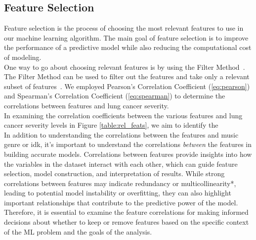 \documentclass[times, twocolumn]{article}
\begin{document}
\subsection{Feature Selection} Feature selection is the process of choosing the most relevant features to use in our machine learning algorithm. The main goal of feature selection is to improve the performance of a predictive model while also reducing the computational cost of modeling.\\

One way to go about choosing relevant features is by using the Filter Method~\cite{HeavyAI}. The Filter Method can be used to filter out the features and take only a relevant subset of features~\cite{HeavyAI}. We employed Pearson's Correlation Coefficient (\ref{eq:pearson}) and Spearman's Correlation Coefficient (\ref{eq:spearman}) to determine the correlations between features and lung cancer severity.\\


In examining the correlation coefficients between the various features and lung cancer severity levels in Figure \ref{table:rel_feats}, we aim to identify the \\

In addition to understanding the correlations between the features and music genre or idk, it's important to understand the correlations \textit{between} the features in building accurate models. Correlations between features provide insights into how the variables in the dataset interact with each other, which can guide feature selection, model construction, and interpretation of results. While strong correlations between features may indicate redundancy or multicollinearity*, leading to potential model instability or overfitting, they can also highlight important relationships that contribute to the predictive power of the model. Therefore, it is essential to examine the feature correlations for making informed decisions about whether to keep or remove features based on the specific context of the ML problem and the goals of the analysis.\\
\end{document}
